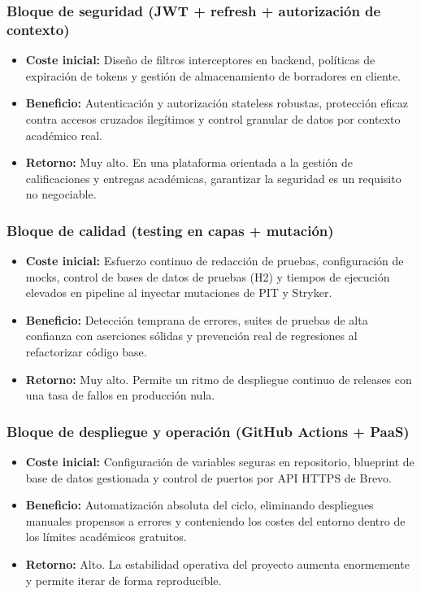 \subsubsection*{Bloque de seguridad (JWT + refresh + autorizaci\'on de contexto)}
\begin{itemize}
    \item \textbf{Coste inicial:} Dise\~no de filtros interceptores en backend, pol\'iticas de expiraci\'on de tokens y gesti\'on de almacenamiento de borradores en cliente.
    \item \textbf{Beneficio:} Autenticaci\'on y autorizaci\'on stateless robustas, protecci\'on eficaz contra accesos cruzados ileg\'itimos y control granular de datos por contexto acad\'emico real.
    \item \textbf{Retorno:} Muy alto. En una plataforma orientada a la gesti\'on de calificaciones y entregas acad\'emicas, garantizar la seguridad es un requisito no negociable.
\end{itemize}

\subsubsection*{Bloque de calidad (testing en capas + mutaci\'on)}
\begin{itemize}
    \item \textbf{Coste inicial:} Esfuerzo continuo de redacci\'on de pruebas, configuraci\'on de mocks, control de bases de datos de pruebas (H2) y tiempos de ejecuci\'on elevados en pipeline al inyectar mutaciones de PIT y Stryker.
    \item \textbf{Beneficio:} Detecci\'on temprana de errores, suites de pruebas de alta confianza con aserciones s\'olidas y prevenci\'on real de regresiones al refactorizar c\'odigo base.
    \item \textbf{Retorno:} Muy alto. Permite un ritmo de despliegue continuo de releases con una tasa de fallos en producci\'on nula.
\end{itemize}

\subsubsection*{Bloque de despliegue y operaci\'on (GitHub Actions + PaaS)}
\begin{itemize}
    \item \textbf{Coste inicial:} Configuraci\'on de variables seguras en repositorio, blueprint de base de datos gestionada y control de puertos por API HTTPS de Brevo.
    \item \textbf{Beneficio:} Automatizaci\'on absoluta del ciclo, eliminando despliegues manuales propensos a errores y conteniendo los costes del entorno dentro de los l\'imites acad\'emicos gratuitos.
    \item \textbf{Retorno:} Alto. La estabilidad operativa del proyecto aumenta enormemente y permite iterar de forma reproducible.
\end{itemize}

